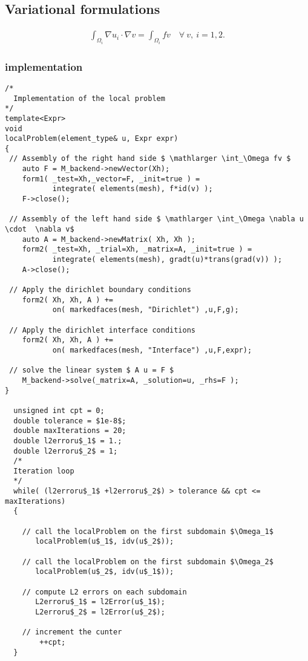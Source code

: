\subsection{Variational formulations}
\label{sec:vari-form-2}

\begin{equation*}
  \begin{aligned}
    \int_{\Omega_i} \nabla u_i \cdot \nabla v = \int_{\Omega_i} fv   \quad \forall~ v,~i=1,2.
  \end{aligned}
\end{equation*}

\subsubsection{\FEEL implementation}
\label{sec:feel-implementation}
\begin{lstlisting}
/*
  Implementation of the local problem
*/
template<Expr>
void
localProblem(element_type& u, Expr expr)
{
 // Assembly of the right hand side $ \mathlarger \int_\Omega fv $
    auto F = M_backend->newVector(Xh);
    form1( _test=Xh,_vector=F, _init=true ) =
           integrate( elements(mesh), f*id(v) );
    F->close();

 // Assembly of the left hand side $ \mathlarger \int_\Omega \nabla u \cdot  \nabla v$
    auto A = M_backend->newMatrix( Xh, Xh );
    form2( _test=Xh, _trial=Xh, _matrix=A, _init=true ) =
           integrate( elements(mesh), gradt(u)*trans(grad(v)) );
    A->close();

 // Apply the dirichlet boundary conditions
    form2( Xh, Xh, A ) +=
           on( markedfaces(mesh, "Dirichlet") ,u,F,g);

 // Apply the dirichlet interface conditions
    form2( Xh, Xh, A ) +=
           on( markedfaces(mesh, "Interface") ,u,F,expr);

 // solve the linear system $ A u = F $
    M_backend->solve(_matrix=A, _solution=u, _rhs=F );
}

  unsigned int cpt = 0;
  double tolerance = $1e-8$;
  double maxIterations = 20;
  double l2erroru$_1$ = 1.;
  double l2erroru$_2$ = 1;
  /*
  Iteration loop
  */
  while( (l2erroru$_1$ +l2erroru$_2$) > tolerance && cpt <= maxIterations)
  {

    // call the localProblem on the first subdomain $\Omega_1$
       localProblem(u$_1$, idv(u$_2$));

    // call the localProblem on the first subdomain $\Omega_2$
       localProblem(u$_2$, idv(u$_1$));

    // compute L2 errors on each subdomain
       L2erroru$_1$ = l2Error(u$_1$);
       L2erroru$_2$ = l2Error(u$_2$);

    // increment the cunter
        ++cpt;
  }

\end{lstlisting}


